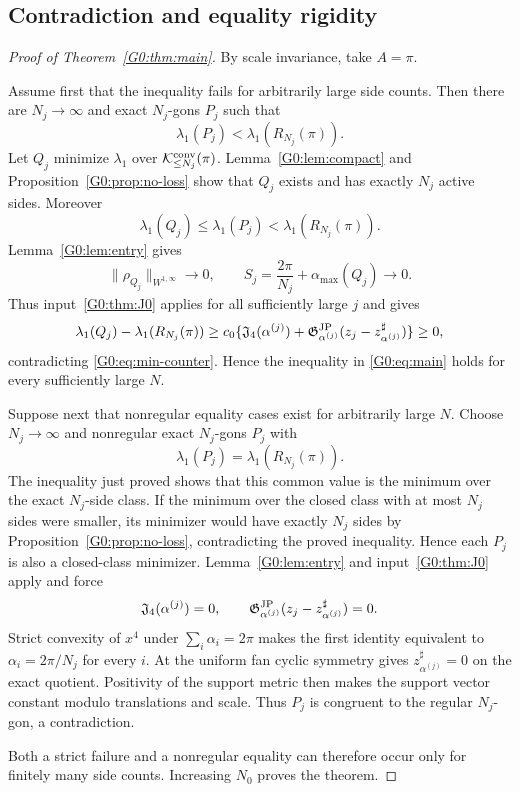 \documentclass[11pt]{amsart}
\numberwithin{equation}{section}
\theoremstyle{definition}
\theoremstyle{remark}
\newcommand{\Jfour}{\mathfrak J_4}
\newcommand{\Gjp}{\mathfrak G^{\rm JP}}
\newcommand{\Kclass}{\mathcal K}
\begin{document}
\subsection{Contradiction and equality rigidity}

\begin{proof}[Proof of Theorem~\ref{G0:thm:main}]
By scale invariance, take $A=\pi$.

Assume first that the inequality fails for arbitrarily large side counts.
Then there are $N_j\to\infty$ and exact $N_j$-gons $P_j$ such that
\begin{equation}\label{G0:eq:strict-counter}
 \lambda_1(P_j)<\lambda_1(R_{N_j}(\pi)).
\end{equation}
Let $Q_j$ minimize $\lambda_1$ over
$\Kclass_{\le N_j}^{\rm conv}(\pi)$.  Lemma~\ref{G0:lem:compact} and
Proposition~\ref{G0:prop:no-loss} show that $Q_j$ exists and has exactly
$N_j$ active sides.  Moreover
\begin{equation}\label{G0:eq:min-counter}
 \lambda_1(Q_j)\le\lambda_1(P_j)
 <\lambda_1(R_{N_j}(\pi)).
\end{equation}
Lemma~\ref{G0:lem:entry} gives
\[
 \|\rho_{Q_j}\|_{W^{1,\infty}}\to0,\qquad
 S_j=\frac{2\pi}{N_j}+\alpha_{\max}(Q_j)\to0.
\]
Thus input~\ref{G0:thm:J0} applies for all sufficiently large $j$ and
gives
\[
 \lambda_1(Q_j)-\lambda_1(R_{N_j}(\pi))
 \ge c_0\{\Jfour(\alpha^{(j)})
 +\Gjp_{\alpha^{(j)}}(
 z_j-z_{\alpha^{(j)}}^\sharp)\}\ge0,
\]
contradicting \eqref{G0:eq:min-counter}.  Hence the inequality in
\eqref{G0:eq:main} holds for every sufficiently large $N$.

Suppose next that nonregular equality cases exist for arbitrarily large
$N$.  Choose $N_j\to\infty$ and nonregular exact $N_j$-gons $P_j$ with
\[
 \lambda_1(P_j)=\lambda_1(R_{N_j}(\pi)).
\]
The inequality just proved shows that this common value is the minimum
over the exact $N_j$-side class.  If the minimum over the closed class
with at most $N_j$ sides were smaller, its minimizer would have exactly
$N_j$ sides by Proposition~\ref{G0:prop:no-loss}, contradicting the proved
inequality.  Hence each $P_j$ is also a closed-class minimizer.
Lemma~\ref{G0:lem:entry} and input~\ref{G0:thm:J0} apply and force
\begin{equation}\label{G0:eq:defect-zero}
 \Jfour(\alpha^{(j)})=0,\qquad
 \Gjp_{\alpha^{(j)}}(
 z_j-z_{\alpha^{(j)}}^\sharp)=0.
\end{equation}
Strict convexity of $x^4$ under $\sum_i\alpha_i=2\pi$ makes the first
identity equivalent to $\alpha_i=2\pi/N_j$ for every $i$.  At the uniform
fan cyclic symmetry gives
$z_{\alpha^{(j)}}^\sharp=0$ on the exact quotient.  Positivity
of the support metric then makes the support vector constant modulo
translations and scale.  Thus $P_j$ is congruent to the regular
$N_j$-gon, a contradiction.

Both a strict failure and a nonregular equality can therefore occur only
for finitely many side counts.  Increasing $N_0$ proves the theorem.
\end{proof}
\endgroup
\end{document}
